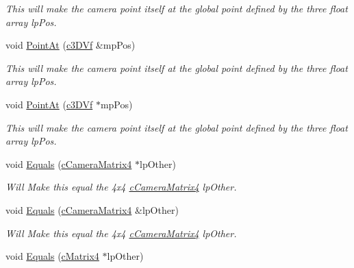 \begin{DoxyCompactItemize}
\begin{DoxyCompactList}\small\item\em This will make the camera point itself at the global point defined by the three float array lpPos. \end{DoxyCompactList}\item 
\hypertarget{classc_camera_matrix4_ac9e73a11692a91065a59af310e8e246b}{
void \hyperlink{classc_camera_matrix4_ac9e73a11692a91065a59af310e8e246b}{PointAt} (\hyperlink{classc3_d_vf}{c3DVf} \&mpPos)}
\label{classc_camera_matrix4_ac9e73a11692a91065a59af310e8e246b}

\begin{DoxyCompactList}\small\item\em This will make the camera point itself at the global point defined by the three float array lpPos. \end{DoxyCompactList}\item 
\hypertarget{classc_camera_matrix4_aee6a49404715d0a891f7e59c0124fc16}{
void \hyperlink{classc_camera_matrix4_aee6a49404715d0a891f7e59c0124fc16}{PointAt} (\hyperlink{classc3_d_vf}{c3DVf} $\ast$mpPos)}
\label{classc_camera_matrix4_aee6a49404715d0a891f7e59c0124fc16}

\begin{DoxyCompactList}\small\item\em This will make the camera point itself at the global point defined by the three float array lpPos. \end{DoxyCompactList}\item 
\hypertarget{classc_camera_matrix4_ac22d068fd30bfd2c5cb23dc06822f500}{
void \hyperlink{classc_camera_matrix4_ac22d068fd30bfd2c5cb23dc06822f500}{Equals} (\hyperlink{classc_camera_matrix4}{cCameraMatrix4} $\ast$lpOther)}
\label{classc_camera_matrix4_ac22d068fd30bfd2c5cb23dc06822f500}

\begin{DoxyCompactList}\small\item\em Will Make this equal the 4x4 \hyperlink{classc_camera_matrix4}{cCameraMatrix4} lpOther. \end{DoxyCompactList}\item 
\hypertarget{classc_camera_matrix4_a6ef73d4d654a0dcf9ffc146908bd88ed}{
void \hyperlink{classc_camera_matrix4_a6ef73d4d654a0dcf9ffc146908bd88ed}{Equals} (\hyperlink{classc_camera_matrix4}{cCameraMatrix4} \&lpOther)}
\label{classc_camera_matrix4_a6ef73d4d654a0dcf9ffc146908bd88ed}

\begin{DoxyCompactList}\small\item\em Will Make this equal the 4x4 \hyperlink{classc_camera_matrix4}{cCameraMatrix4} lpOther. \end{DoxyCompactList}\item 
\hypertarget{classc_camera_matrix4_ab6b4ff506c700a7e209dae84eb52d4ef}{
void \hyperlink{classc_camera_matrix4_ab6b4ff506c700a7e209dae84eb52d4ef}{Equals} (\hyperlink{classc_matrix4}{cMatrix4} $\ast$lpOther)}
\label{classc_camera_matrix4_ab6b4ff506c700a7e209dae84eb52d4ef}


\end{DoxyCompactItemize}
